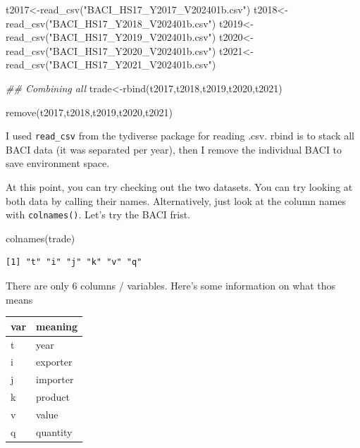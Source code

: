 \documentclass[
  a4paper,
  DIV=11,
  numbers=noendperiod]{scrreprt}
\newenvironment{Shaded}{\begin{snugshade}}{\end{snugshade}}
\newcommand{\DocumentationTok}[1]{\textcolor[rgb]{0.37,0.37,0.37}{\textit{#1}}}
\newcommand{\FunctionTok}[1]{\textcolor[rgb]{0.28,0.35,0.67}{#1}}
\newcommand{\NormalTok}[1]{\textcolor[rgb]{0.00,0.23,0.31}{#1}}
\newcommand{\OtherTok}[1]{\textcolor[rgb]{0.00,0.23,0.31}{#1}}
\newcommand{\StringTok}[1]{\textcolor[rgb]{0.13,0.47,0.30}{#1}}
\begin{document}
\begin{Shaded}
\begin{Highlighting}[numbers=left,,]
\NormalTok{t2017}\OtherTok{\textless{}{-}}\FunctionTok{read\_csv}\NormalTok{(}\StringTok{"BACI\_HS17\_Y2017\_V202401b.csv"}\NormalTok{)}
\NormalTok{t2018}\OtherTok{\textless{}{-}}\FunctionTok{read\_csv}\NormalTok{(}\StringTok{"BACI\_HS17\_Y2018\_V202401b.csv"}\NormalTok{)}
\NormalTok{t2019}\OtherTok{\textless{}{-}}\FunctionTok{read\_csv}\NormalTok{(}\StringTok{"BACI\_HS17\_Y2019\_V202401b.csv"}\NormalTok{)}
\NormalTok{t2020}\OtherTok{\textless{}{-}}\FunctionTok{read\_csv}\NormalTok{(}\StringTok{"BACI\_HS17\_Y2020\_V202401b.csv"}\NormalTok{)}
\NormalTok{t2021}\OtherTok{\textless{}{-}}\FunctionTok{read\_csv}\NormalTok{(}\StringTok{"BACI\_HS17\_Y2021\_V202401b.csv"}\NormalTok{)}


\DocumentationTok{\#\# Combining all }
\NormalTok{trade}\OtherTok{\textless{}{-}}\FunctionTok{rbind}\NormalTok{(t2017,t2018,t2019,t2020,t2021)}

\FunctionTok{remove}\NormalTok{(t2017,t2018,t2019,t2020,t2021)}
\end{Highlighting}
\end{Shaded}

I used \texttt{read\_csv} from the tydiverse package for reading .csv.
rbind is to stack all BACI data (it was separated per year), then I
remove the individual BACI to save environment space.

At this point, you can try checking out the two datasets. You can try
looking at both data by calling their names. Alternatively, just look at
the column names with \texttt{colnames()}. Let's try the BACI frist.

\begin{Shaded}
\begin{Highlighting}[]
\FunctionTok{colnames}\NormalTok{(trade)}
\end{Highlighting}
\end{Shaded}

\begin{verbatim}
[1] "t" "i" "j" "k" "v" "q"
\end{verbatim}

There are only 6 columns / variables. Here's some information on what
thos means

\begin{longtable}[]{@{}ll@{}}
\toprule\noalign{}
var & meaning \\
\midrule\noalign{}
\endhead
\bottomrule\noalign{}
\endlastfoot
t & year \\
i & exporter \\
j & importer \\
k & product \\
v & value \\
q & quantity \\
\end{longtable}
\end{document}
